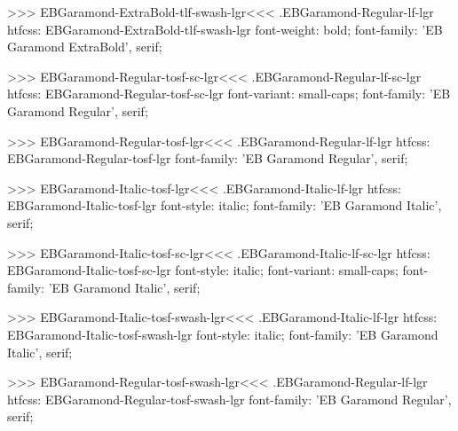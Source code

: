 >>>
\<EBGaramond-ExtraBold-tlf-swash-lgr\><<<
.EBGaramond-Regular-lf-lgr
htfcss:  EBGaramond-ExtraBold-tlf-swash-lgr  font-weight: bold; font-family: 'EB Garamond ExtraBold', serif;

>>>
\<EBGaramond-Regular-tosf-sc-lgr\><<<
.EBGaramond-Regular-lf-sc-lgr
htfcss:  EBGaramond-Regular-tosf-sc-lgr  font-variant: small-caps; font-family: 'EB Garamond Regular', serif;

>>>
\<EBGaramond-Regular-tosf-lgr\><<<
.EBGaramond-Regular-lf-lgr
htfcss:  EBGaramond-Regular-tosf-lgr  font-family: 'EB Garamond Regular', serif;

>>>
\<EBGaramond-Italic-tosf-lgr\><<<
.EBGaramond-Italic-lf-lgr
htfcss:  EBGaramond-Italic-tosf-lgr  font-style: italic; font-family: 'EB Garamond Italic', serif;

>>>
\<EBGaramond-Italic-tosf-sc-lgr\><<<
.EBGaramond-Italic-lf-sc-lgr
htfcss:  EBGaramond-Italic-tosf-sc-lgr  font-style: italic; font-variant: small-caps; font-family: 'EB Garamond Italic', serif;

>>>
\<EBGaramond-Italic-tosf-swash-lgr\><<<
.EBGaramond-Italic-lf-lgr
htfcss:  EBGaramond-Italic-tosf-swash-lgr  font-style: italic; font-family: 'EB Garamond Italic', serif;

>>>
\<EBGaramond-Regular-tosf-swash-lgr\><<<
.EBGaramond-Regular-lf-lgr
htfcss:  EBGaramond-Regular-tosf-swash-lgr  font-family: 'EB Garamond Regular', serif;

